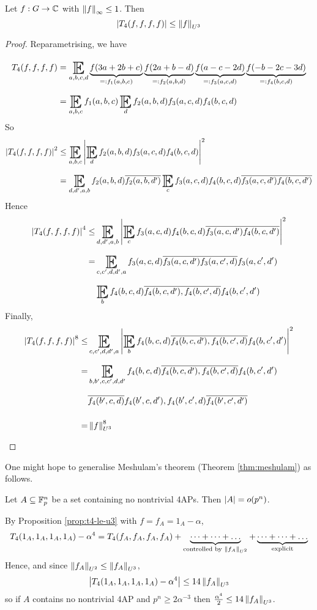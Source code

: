 \documentclass{article}
\begin{document}
\begin{nprop}\label{prop:t4-le-u3}
  Let $f : G \to \mathbb C$ with $\left\lVert f\right\rVert_\infty \le 1$. Then
  $$\left\lvert T_4(f, f, f, f)\right\rvert \le \left\lVert f\right\rVert_{U^3}$$
\end{nprop}
\begin{proof}
  Reparametrising, we have
  \begin{align*}
    T_4(f, f, f, f)
    & = \E_{a, b, c, d}
    \underbrace{f(3a + 2b + c)}_{=: f_1(a, b, c)}
    \underbrace{f(2a + b - d)}_{=: f_2(a, b, d)}
    \underbrace{f(a - c - 2d)}_{=: f_3(a, c, d)}
    \underbrace{f(-b - 2c - 3d)}_{=: f_4(b, c, d)} \\
    & = \E_{a, b, c} f_1(a, b, c) \E_d f_2(a, b, d) f_3(a, c, d) f_4(b, c, d)
  \end{align*}
  So
  \begin{align*}
    \abs{T_4(f, f, f, f)}^2
    & \le \E_{a, b, c} \abs{\E_d f_2(a, b, d) f_3(a, c, d) f_4(b, c, d)}^2 \\
    & = \E_{d, d', a, b} f_2(a, b, d) \overline{f_2(a, b, d')} \E_c f_3(a, c, d) f_4(b, c, d) \overline{f_3(a, c, d') f_4(b, c, d')}
  \end{align*}
  Hence
  \begin{align*}
    \abs{T_4(f, f, f, f)}^4
    \le & \E_{d, d', a, b} \abs{\E_c f_3(a, c, d) f_4(b, c, d) \overline{f_3(a, c, d') f_4(b, c, d')}}^2 \\
    = & \E_{c, c', d, d', a} f_3(a, c, d) \overline{f_3(a, c, d') f_3(a, c', d)} f_3(a, c', d') \\
    & \E_b f_4(b, c, d) \overline{f_4(b, c, d'), f_4(b, c', d)} f_4(b, c', d')
  \end{align*}
  Finally,
  \begin{align*}
    \abs{T_4(f, f, f, f)}^8
    \le & \E_{c, c', d, d', a} \abs{\E_b f_4(b, c, d) \overline{f_4(b, c, d'), f_4(b, c', d)} f_4(b, c', d')}^2 \\
    = & \E_{b, b', c, c', d, d'} f_4(b, c, d) \overline{f_4(b, c, d'), f_4(b, c', d)} f_4(b, c', d') \\
    & \overline{f_4(b', c, d)} f_4(b', c, d'), f_4(b', c', d) \overline{f_4(b', c', d')} \\
    = & \norm f_{U^3}^8
  \end{align*}
\end{proof}

One might hope to generalise Meshulam's theorem (Theorem \ref{thm:meshulam}) as follows.

\begin{nthm}
  Let $A \subseteq \mathbb F_p^n$ be a set containing no nontrivial 4APs. Then $\left\lvert A\right\rvert = o(p^n)$.
\end{nthm}
\begin{idea}
  By Proposition \ref{prop:t4-le-u3} with $f = f_A = 1_A - \alpha$,
  $$T_4(1_A, 1_A, 1_A, 1_A) - \alpha^4 = T_4(f_A, f_A, f_A, f_A) + \underbrace{\dots + \dots + \dots}_{\text{controlled by } \left\lVert f_A\right\rVert_{U^2}} + \underbrace{\dots + \dots + \dots}_{\text{explicit}}$$
  Hence, and since $\left\lVert f_A\right\rVert_{U^2} \le \left\lVert f_A\right\rVert_{U^3}$,
  $$\left\lvert T_4(1_A, 1_A, 1_A, 1_A) - \alpha^4\right\rvert \le 14\left\lVert f_A\right\rVert_{U^3}$$
  so if $A$ contains no nontrivial 4AP and $p^n \ge 2\alpha^{-3}$ then $\frac{\alpha^4}2 \le 14\left\lVert f_A\right\rVert_{U^3}$.
\end{idea}
\end{document}
